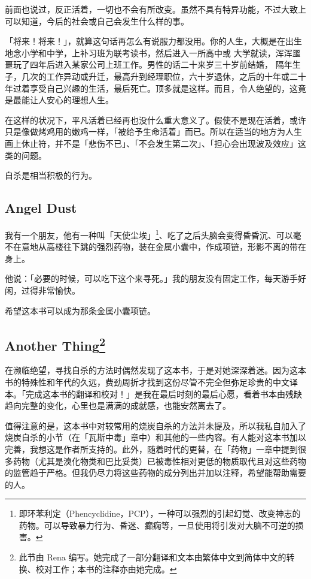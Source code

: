 \documentclass[UTF8]{ctexart}
\begin{document}
前面也说过，反正活着，一切也不会有所改变。虽然不具有特异功能，不过大致上可以知道，今后的社会或自己会发生什么样的事。

「将来！将来！」，就算这句话再怎么有说服力都没用。你的人生，大概是在出生地念小学和中学，上补习班为联考读书，然后进入一所高中或 大学就读，浑浑噩噩玩了四年后进入某家公司上班工作。男性的话二十来岁三十岁前结婚， 隔年生子，几次的工作异动或升迁，最高升到经理职位，六十岁退休，之后的十年或二十年过着享受自己兴趣的生活，最后死亡。顶多就是这样。而且，令人绝望的，这竟是最能让人安心的理想人生。 

在这样的状况下，平凡活着已经再也没什么重大意义了。假使不是现在活着，或许只是像做烤鸡用的嫩鸡一样，「被给予生命活着」而已。所以在适当的地方为人生画上休止符，并不是「悲伤不已」、「不会发生第二次」、「担心会出现波及效应」这类的问题。

自杀是相当积极的行为。

\subsection{Angel Dust}

我有一个朋友，他有一种叫「天使尘埃」\footnote{即环苯利定（Phencyclidine，PCP），一种可以强烈的引起幻觉、改变神志的药物。可以导致暴力行为、昏迷、癫痫等，一旦使用将引发对大脑不可逆的损害。}、吃了之后头脑会变得昏昏沉、可以毫不在意地从高楼往下跳的强烈药物，装在金属小囊中，作成项链，形影不离的带在身上。

他说：「必要的时候，可以吃下这个来寻死。」我的朋友没有固定工作，每天游手好闲，过得非常愉快。

希望这本书可以成为那条金属小囊项链。

\subsection*{Another Thing\footnote{此节由 Rena 编写。她完成了一部分翻译和文本由繁体中文到简体中文的转换、校对工作；本书的注释亦由她完成。\cite{ref1}}}

在濒临绝望，寻找自杀的方法时偶然发现了这本书，于是对她深深着迷。因为这本书的特殊性和年代的久远，费劲周折才找到这份尽管不完全但弥足珍贵的中文译本。「完成这本书的翻译和校对！」是我在最后时刻的最后心愿，看着书本由残缺趋向完整的变化，心里也是满满的成就感，也能安然离去了。

值得注意的是，这本书中对较常用的烧炭自杀的方法并未提及，所以我私自加入了烧炭自杀的小节（在「瓦斯中毒」章中）和其他的一些内容。有人能对这本书加以完善，我想这是作者所支持的。此外，随着时代的更替，在「药物」一章中提到很多药物（尤其是溴化物类和巴比妥类）已被毒性相对更低的物质取代且对这些药物的监管趋于严格。但我仍尽力将这些药物的成分列出并加以注释，希望能帮助需要的人。
\end{document}
